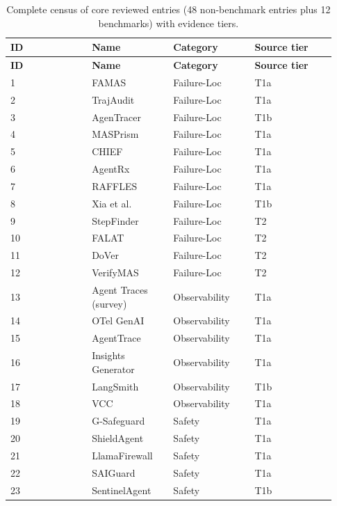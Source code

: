 \documentclass[preprint,12pt]{elsarticle}
\begin{document}
\begin{center}
\begingroup
\setlength{\tabcolsep}{2pt}
\renewcommand{\arraystretch}{1.16}
\footnotesize
\begin{longtable}{|p{0.233\linewidth}|p{0.233\linewidth}|p{0.233\linewidth}|p{0.233\linewidth}|}
\caption{Complete census of core reviewed entries (48 non-benchmark entries plus 12 benchmarks) with evidence tiers.}\label{tab:v5_13}\\
\hline
\textbf{ID} & \textbf{Name} & \textbf{Category} & \textbf{Source tier} \\ \hline
\endfirsthead
\textbf{ID} & \textbf{Name} & \textbf{Category} & \textbf{Source tier} \\ \hline
\endhead
1 & FAMAS & Failure-Loc & T1a \\ \hline
2 & TrajAudit & Failure-Loc & T1a \\ \hline
3 & AgenTracer & Failure-Loc & T1b \\ \hline
4 & MASPrism & Failure-Loc & T1a \\ \hline
5 & CHIEF & Failure-Loc & T1a \\ \hline
6 & AgentRx & Failure-Loc & T1a \\ \hline
7 & RAFFLES & Failure-Loc & T1a \\ \hline
8 & Xia et al. & Failure-Loc & T1b \\ \hline
9 & StepFinder & Failure-Loc & T2 \\ \hline
10 & FALAT & Failure-Loc & T2 \\ \hline
11 & DoVer & Failure-Loc & T2 \\ \hline
12 & VerifyMAS & Failure-Loc & T2 \\ \hline
13 & Agent Traces (survey) & Observability & T1a \\ \hline
14 & OTel GenAI & Observability & T1a \\ \hline
15 & AgentTrace & Observability & T1a \\ \hline
16 & Insights Generator & Observability & T1a \\ \hline
17 & LangSmith\cite{v5supp1} & Observability & T1b \\ \hline
18 & VCC & Observability & T1a \\ \hline
19 & G-Safeguard & Safety & T1a \\ \hline20 & ShieldAgent & Safety & T1a \\ \hline
21 & LlamaFirewall & Safety & T1a \\ \hline
22 & SAIGuard & Safety & T1a \\ \hline
23 & SentinelAgent & Safety & T1b \\ \hline

\end{longtable}
\end{center}
\end{document}
